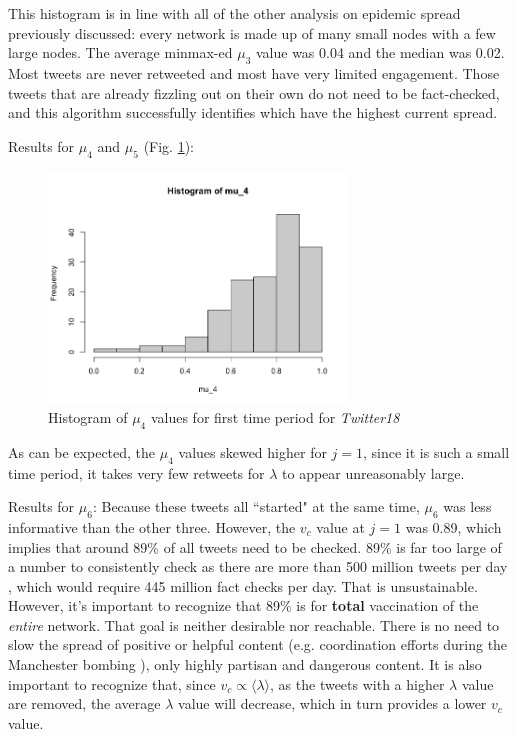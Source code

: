 \documentclass[preprint,review,12pt]{elsarticle}
\begin{document}
This histogram is in line with all of the other analysis on epidemic spread previously discussed: every network is made up of many small nodes with a few large nodes. The average minmax-ed $\mu_3$ value was 0.04 and the median was 0.02. Most tweets are never retweeted and most have very limited engagement. Those tweets that are already fizzling out on their own do not need to be fact-checked, and this algorithm successfully identifies which have the highest current spread. 

Results for $\mu_4$ and $\mu_5$ (Fig. \ref{fig:Hist mu_4 Twitter18}):
\begin{figure}[h!]
    \centering
    \includegraphics[width=8cm]{histogram of mu_4.png}
    \caption{Histogram of $\mu_4$ values for first time period for \textit{Twitter18}}
    \label{fig:Hist mu_4 Twitter18}
\end{figure}
As can be expected, the $\mu_4$ values skewed higher for $j=1$, since it is such a small time period, it takes very few retweets for $\lambda$ to appear unreasonably large.  

Results for $\mu_6$:
Because these tweets all ``started" at the same time, $\mu_6$ was less informative than the other three. However, the $v_c$ value at $j=1$ was 0.89, which implies that around 89\% of all tweets need to be checked. 89\% is far too large of a number to consistently check as there are more than 500 million tweets per day \cite{raffi2013tweets}, which would require 445 million fact checks per day. That is unsustainable. However, it's important to recognize that 89\% is for \textbf{total} vaccination of the \textit{entire} network. That goal is neither desirable nor reachable. There is no need to slow the spread of positive or helpful content (e.g. coordination efforts during the Manchester bombing \cite{mirbabaie2020breaking, eriksson2016facebook}), only highly partisan and dangerous content. It is also important to recognize that, since $v_c \propto \langle \lambda \rangle$, as the tweets with a higher $\lambda$ value are removed, the average $\lambda$ value will decrease, which in turn provides a lower $v_c$ value.
\end{document}
